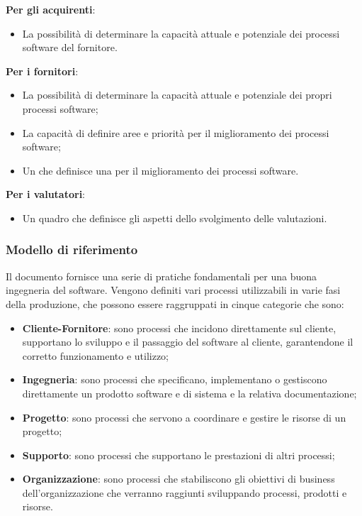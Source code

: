 \documentclass[../piano-di-qualifica.tex]{subfiles}
\begin{document}
\textbf{Per gli acquirenti}:
\begin{itemize}
    \item La possibilità di determinare la capacità attuale e potenziale dei processi software del fornitore.
\end{itemize}

\textbf{Per i fornitori}:
\begin{itemize}
    \item La possibilità di determinare la capacità attuale e potenziale dei propri processi software;
    \item La capacità di definire aree e priorità per il miglioramento dei processi software;
    \item Un  che definisce una  per il miglioramento dei processi software.
\end{itemize}

\textbf{Per i valutatori}:
\begin{itemize}
    \item Un quadro che definisce gli aspetti dello svolgimento delle valutazioni.
\end{itemize}

\subsubsection{Modello di riferimento}
\label{sub:modello_di_riferimento}
Il documento fornisce una serie di pratiche fondamentali per una buona ingegneria del software.
Vengono definiti vari processi utilizzabili in varie fasi della produzione, che possono essere raggruppati in cinque categorie che sono:

\begin{itemize}
    \item \textbf{Cliente-Fornitore}: sono processi che incidono direttamente sul cliente, supportano lo sviluppo e il passaggio del software al cliente, garantendone il corretto funzionamento e utilizzo;
    \item \textbf{Ingegneria}: sono processi che specificano, implementano o gestiscono direttamente un prodotto software e di sistema e la relativa documentazione;
    \item \textbf{Progetto}: sono processi che servono a coordinare e gestire le risorse di un progetto;
    \item \textbf{Supporto}: sono processi che supportano le prestazioni di altri processi;
    \item \textbf{Organizzazione}: sono processi che stabiliscono gli obiettivi di business dell'organizzazione che verranno raggiunti sviluppando processi, prodotti e risorse.
\end{itemize}
\end{document}
